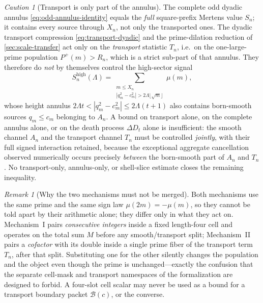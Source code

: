 \documentclass[11pt]{article}
\theoremstyle{definition}
\theoremstyle{remark}
\newtheorem{remark}[theorem]{Remark}
\newtheorem{caution}[theorem]{Caution}
\newcommand{\Pplus}{P^{+}}
\newcommand{\1}{\mathbf{1}}
\begin{document}
\begin{caution}[Transport is only part of the annulus]
\label{warn:transport-partial}
The complete odd dyadic annulus \cref{eq:odd-annulus-identity} equals the \emph{full} square-prefix Mertens value $S_n$; it contains every source through $X_n$, not only the transported ones.  The dyadic transport compression \cref{eq:transport-dyadic} and the prime-dilation reduction of \cref{sec:scale-transfer} act only on the \emph{transport} statistic $T_n$, i.e.\ on the one-large-prime population $\Pplus(m)>R_n$, which is a strict sub-part of that annulus.  They therefore do \emph{not} by themselves control the high-sector signal
\[
 S_n^{\mathrm{high}}(\Lambda)
 =\!\!\sum_{\substack{m\le X_n\\ |q_m^2-c_m^2|>2\Lambda\lfloor\sqrt m\rfloor}}\!\!\mu(m),
\]
whose height annulus $2\Lambda t<|q_m^2-c_m^2|\le2\Lambda(t+1)$ also contains born-smooth sources $q_m\le c_m$ belonging to $A_n$.  A bound on transport alone, on the complete annulus alone, or on the death process $\Delta D_t$ alone is insufficient: the smooth channel $A_n$ and the transport channel $T_n$ must be controlled \emph{jointly}, with their full signed interaction retained, because the exceptional aggregate cancellation observed numerically occurs precisely \emph{between} the born-smooth part of $A_n$ and $T_n$.  No transport-only, annulus-only, or shell-slice estimate closes the remaining inequality.
\end{caution}

\begin{remark}[Why the two mechanisms must not be merged]
\label{rem:no-merge}
Both mechanisms use the same prime and the same sign law $\mu(2m)=-\mu(m)$, so they cannot be told apart by their arithmetic alone; they differ only in what they act on.  Mechanism~I pairs \emph{consecutive integers} inside a fixed length-four cell and operates on the total sum $M$ before any smooth/transport split; Mechanism~II pairs a \emph{cofactor} with its double inside a single prime fiber of the transport term $T_n$, after that split.  Substituting one for the other silently changes the population and the object even though the prime is unchanged---exactly the confusion that the separate cell-mask and transport namespaces of the formalization are designed to forbid.  A four-slot cell scalar may never be used as a bound for a transport boundary packet $\mathcal B(c)$, or the converse.
\end{remark}

\end{document}
